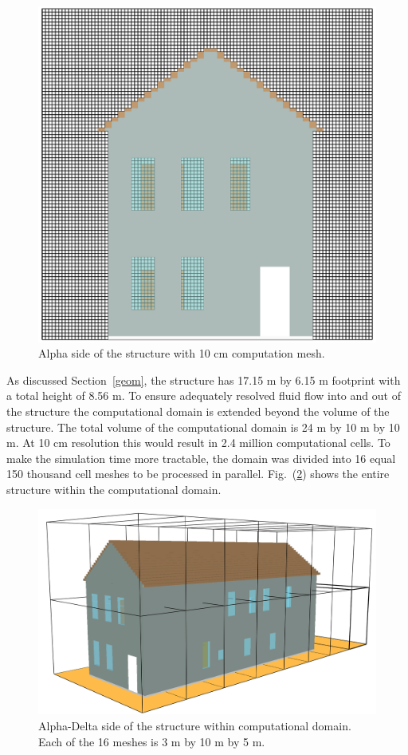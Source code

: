 \documentclass[11pt,oneside]{book}
\begin{document}
\begin{figure}[h!]
\centering
\includegraphics[width=.60\textwidth]{../Figures/smv_exterior_grid}
\caption{Alpha side of the structure with 10 cm computation mesh.}
\label{fig:geom_grid}
\end{figure}

As discussed Section~\ref{geom}, the structure has 17.15 m by 6.15 m footprint with a total height of 8.56 m. To ensure adequately resolved fluid flow into and out of the structure the computational domain is extended beyond the volume of the structure. The total volume of the computational domain is 24 m by 10 m by 10 m. At 10 cm resolution this would result in 2.4 million computational cells. To make the simulation time more tractable, the domain was divided into 16 equal 150 thousand cell meshes to be processed in parallel. Fig.~(\ref{fig:mult_mesh}) shows the entire structure within the computational domain.

\begin{figure}[h!]
\centering
\includegraphics[width=.60\textwidth]{../Figures/smv_exterior_mesh}
\caption{Alpha-Delta side of the structure within computational domain. Each of the 16 meshes is 3 m by 10 m by 5 m.}
\label{fig:mult_mesh}
\end{figure}
\end{document}
